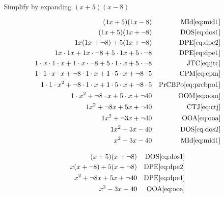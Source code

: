 \begin{example}[id:20141109-133008] \label{20141109-133008}   \hfill \\

Simplify by expanding $(x+5)(x-8)$

\soln

\solnsteps
\begin{align*}
(1x+5)(1x-8)  && \text{MId} \eqref{eq:mid1} \\
(1x+5)(1x+\neg 8)  && \text{DOS} \eqref{eq:dos1} \\
1x(1x+\neg 8) + 5(1x+\neg 8) && \text{DPE} \eqref{eq:dpe2} \\
1x \cdot 1x + 1x \cdot \neg 8 + 5 \cdot 1x + 5 \cdot \neg 8 && \text{DPE} \eqref{eq:dpe1} \\
1 \cdot x \cdot 1 \cdot x + 1 \cdot x \cdot \neg 8 + 5 \cdot 1 \cdot x + 5 \cdot \neg 8 && \text{JTC} \eqref{eq:jtc} \\
1 \cdot 1 \cdot x \cdot x + \neg 8 \cdot 1 \cdot x + 1 \cdot 5 \cdot x + \neg 8 \cdot 5  && \text{CPM} \eqref{eq:cpm} \\
1 \cdot 1 \cdot x^2 + \neg 8 \cdot 1 \cdot x + 1 \cdot 5 \cdot x + \neg 8 \cdot 5 && \text{PrCBPo} \eqref{eq:prcbpo1} \\
1 \cdot x^2 + \neg 8 \cdot x + 5 \cdot x  + \neg 40  && \text{OOM} \eqref{eq:oom} \\
1  x^2 +  \neg 8 x +5x + \neg 40  && \text{CTJ} \eqref{eq:ctj} \\
1 x^2 + \neg 3 x + \neg 40  && \text{OOA} \eqref{eq:ooa} \\
1 x^2 - 3x - 40  && \text{DOS} \eqref{eq:dos2} \\
x^2-3x-40  && \text{MId} \eqref{eq:mid1} 
\end{align*}

\soln

\lesssteps
\begin{align*}
(x+5)(x+\neg 8) && \text{DOS} \eqref{eq:dos1} \\
x(x+\neg 8)+ 5(x+\neg 8) && \text{DPE} \eqref{eq:dpe2} \\
x^2 + \neg 8x + 5x + \neg 40 && \text{DPE} \eqref{eq:dpe1} \\ 
x^2-3x-40 && \text{OOA} \eqref{eq:ooa} 
\end{align*}

\end{example}

